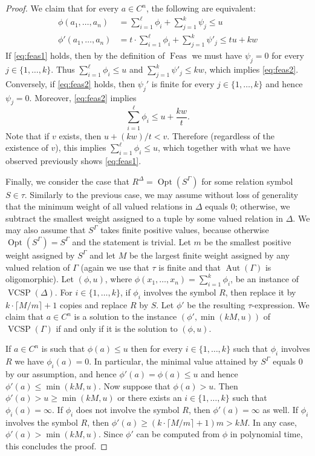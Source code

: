 \documentclass[nonacm]{acmart}
\DeclareMathOperator{\Aut}{Aut}
\DeclareMathOperator{\VCSP}{VCSP}
\DeclareMathOperator{\Opt}{Opt}
\DeclareMathOperator{\Feas}{Feas}
\begin{document}
\begin{proof}
We claim that for every $a\in C^n$, the following are equivalent:
\begin{align}
 \phi(a_1, \dots, a_n) & = \sum_{i=1}^{\ell} \phi_i+  \sum_{j=1}^k \psi_j  \leq u   \label{eq:feas1}\\
  \phi'(a_1, \dots, a_n) & = t  \cdot \sum_{i=1}^{\ell} \phi_i+ \sum_{j=1}^k \psi'_j  \leq tu+kw \label{eq:feas2}
\end{align}
If \eqref{eq:feas1} holds, then by the definition of $\Feas$ we must have $\psi_j=0$ for every $j \in \{1, \dots, k\}$. Thus $\sum_{i=1}^{\ell} \phi_i \leq u$ and $\sum_{j=1}^k \psi'_j \leq kw$, which implies \eqref{eq:feas2}. Conversely, if \eqref{eq:feas2} holds, then  $\psi_j'$ is finite for every $j \in\{1, \dots, k\}$ and hence $\psi_j=0$. Moreover, \eqref{eq:feas2} implies
\[\sum_{i=1}^{\ell} \phi_i \leq u + \frac{kw}{t}.\] Note that if $v$ exists, then $u + (kw)/t < v$. Therefore (regardless of the existence of $v$), this implies $\sum_{i=1}^{\ell} \phi_i \leq u$, which together with what we have observed previously shows \eqref{eq:feas1}.

Finally, we consider the case that $R^{\Delta} = \Opt(S^{\Gamma})$ for some relation symbol $S \in \tau$.  
Similarly to the previous case, we may assume without loss of generality that 
the minimum weight of all valued relations in $\Delta$ equals $0$; otherwise, we subtract the smallest weight 
assigned to a tuple by some 
valued relation in $\Delta$. 
We may also assume that $S^{\Gamma}$ takes finite positive values, because otherwise $\Opt(S^{\Gamma}) = S^{\Gamma}$ and the statement is trivial. 
Let $m$ be the smallest positive weight assigned by $S^{\Gamma}$ and let $M$ be the largest finite weight assigned by any valued relation 
of $\Gamma$ (again we use that $\tau$
is finite and that $\Aut(\Gamma)$ is oligomorphic). Let $(\phi, u)$, where $\phi(x_1,\dots,x_n)= \sum_{i=1}^k\phi_i$, be an instance  of $\VCSP(\Delta)$. For $i \in \{1,\dots,k\}$, if $\phi_i$ involves the symbol $R$, then replace it by $k \cdot \lceil M/m \rceil + 1$ copies and replace $R$ by $S$. Let $\phi'$ be the resulting $\tau$-expression.
We claim that $a \in C^n$ is a solution to the instance $(\phi',\min(kM,u))$ of $\VCSP(\Gamma)$ if and only if it is the solution to $(\phi,u)$.

If $a \in C^n$ is such that
$\phi(a) \leq u$ then for every $i \in \{1,\dots,k\}$ such that $\phi_i$ involves $R$ we have $\phi_i(a) = 0$. In particular, the minimal value attained by $S^{\Gamma}$ equals $0$ by our assumption, and hence $\phi'(a) = \phi(a) \leq u$
and hence $\phi'(a) \leq \min(kM,u)$.
Now suppose that 
$\phi(a) > u$. Then 
$\phi'(a)>u \geq \min(kM,u)$ or
there exists an $i \in \{1,\dots,k\}$ such that $\phi_i(a) = \infty$.
If $\phi_i$ does not involve the symbol $R$, then $\phi'(a) = \infty$ as well. If $\phi_i$  involves the symbol $R$, then $\phi'(a) \geq (k \cdot \lceil M/m \rceil + 1) m > kM$. In any case, $\phi'(a)>\min(kM, u)$.
Since $\phi'$ can be computed from $\phi$ in polynomial time, this concludes the proof.
\end{proof}
\end{document}

